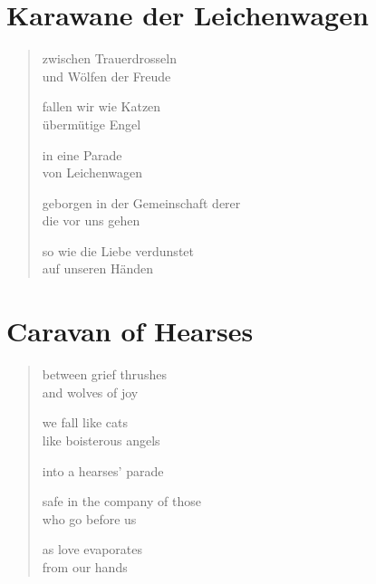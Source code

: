 
\cleartoverso

\section{Karawane der Leichenwagen}

\begin{verse}

zwischen Trauerdrosseln\\
und Wölfen der Freude

fallen wir wie Katzen\\
übermütige Engel

in eine Parade\label{rilke}\\
von Leichenwagen

geborgen in der Gemeinschaft derer\\
die vor uns gehen

so wie die Liebe verdunstet\\
auf unseren Händen

\end{verse}

\clearpage

\section{Caravan of Hearses}

\begin{verse}

between grief thrushes\\
and wolves of joy

we fall like cats\\
like boisterous angels

into a hearses' parade

safe in the company of those\\
who go before us

as love evaporates\\
from our hands

\end{verse}

